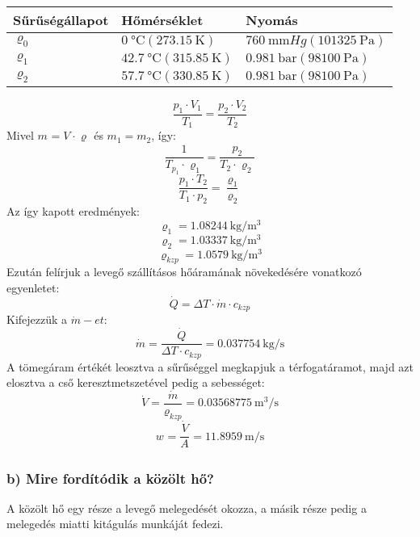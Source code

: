 \begin{tabular}{ | p{3 cm} | p{6 cm} | p{5.5 cm} | } 
	\hline
	Sűrűségállapot & Hőmérséklet & Nyomás \\ 
	\hline
	$\varrho_{0}$ & $\SI{0}{\celsius} (\SI{273.15}{\kelvin}) $ & $ \SI{760}{\milli\meter}Hg (\SI{101325}{\pascal}) $ \\ 
	\hline
	$\varrho_{1}$ & $\SI{42.7}{\celsius} (\SI{315.85}{\kelvin}) $ & $ \SI{0.981}{\bar} (\SI{98100}{\pascal}) $ \\ 
	\hline
	$\varrho_{2}$ & $\SI{57.7}{\celsius} (\SI{330.85}{\kelvin}) $ & $ \SI{0.981}{\bar} (\SI{98100}{\pascal}) $ \\ 
	\hline
\end{tabular}
\vspace{0.5cm}
\begin{equation*}
\dfrac{p_{1} \cdot V_{1}}{T_{1}}=\dfrac{p_{2} \cdot V_{2}}{T_{2}}
\end{equation*}
\noindent Mivel $m_{}= V_{} \cdot \varrho_{}$  és $m_{1}=m_{2}$, így:
\begin{equation*}
\dfrac{1}{T_{p_{1}}\cdot \varrho_{1}}=\dfrac{p_{2}}{T_{2}\cdot \varrho_{2}}
\end{equation*}
\begin{equation*}
\dfrac{p_{1} \cdot T_{2} }{T_{1} \cdot p_{2}}=\dfrac{\varrho_{1}}{\varrho_{2}}
\end{equation*}
\noindent Az így kapott eredmények:
\begin{equation*}
\varrho_{1}=\SI{1.08244}{\kilo\gram\per\meter\cubed}
\end{equation*}
\begin{equation*}
\varrho_{2}=\SI{1.03337}{\kilo\gram\per\meter\cubed}
\end{equation*}
\begin{equation*}
\varrho_{kzp}=\SI{1.0579}{\kilo\gram\per\meter\cubed}
\end{equation*}
\noindent Ezután felírjuk a levegő szállításos hőáramának növekedésére vonatkozó egyenletet:
\begin{equation*}
\dot{Q}= \Delta T \cdot \dot{m} \cdot c_{kzp}
\end{equation*}
\noindent Kifejezzük a $\dot{m}-et$:
\begin{equation*}
\dot{m}= \dfrac{\dot{Q}}{\Delta T \cdot c_{kzp}}= \SI{0.037754}{\kilo\gram\per\second}
\end{equation*}
\noindent A tömegáram értékét leosztva a sűrűséggel megkapjuk  a térfogatáramot, majd azt elosztva a cső keresztmetszetével pedig a sebességet:
\begin{equation*}
\dot{V}= \dfrac{\dot{m}}{\varrho_{kzp}}= \SI{0.03568775}{\meter\cubed\per\second}
\end{equation*}
\begin{equation*}
w_{}= \dfrac{\dot{V}}{A_{}}= \SI{11.8959}{\meter\per\second}
\end{equation*}
\subsubsection*{b) Mire fordítódik a közölt hő? }
\noindent A közölt hő egy része a levegő melegedését okozza, a másik része pedig a melegedés miatti kitágulás munkáját fedezi.
\pagebreak